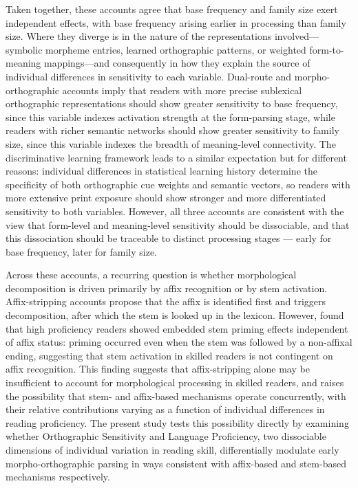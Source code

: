 Taken together, these accounts agree that base frequency and family size exert independent effects, with base frequency arising earlier in processing than family size. Where they diverge is in the nature of the representations involved---symbolic morpheme entries, learned orthographic patterns, or weighted form-to-meaning mappings---and consequently in how they explain the source of individual differences in sensitivity to each variable. Dual-route and morpho-orthographic accounts imply that readers with more precise sublexical orthographic representations should show greater sensitivity to base frequency, since this variable indexes activation strength at the form-parsing stage, while readers with richer semantic networks should show greater sensitivity to family size, since this variable indexes the breadth of meaning-level connectivity. The discriminative learning framework leads to a similar expectation but for different reasons: individual differences in statistical learning history determine the specificity of both orthographic cue weights and semantic vectors, so readers with more extensive print exposure should show stronger and more differentiated sensitivity to both variables. However, all three accounts are consistent with the view that form-level and meaning-level sensitivity should be dissociable, and that this dissociation should be traceable to distinct processing stages --- early for base frequency, later for family size.
	
	Across these accounts, a recurring question is whether morphological decomposition is driven primarily by affix recognition or by stem activation. Affix-stripping accounts \citep{taft_lexical_1975, rastleMorphologicalDecompositionBased2008} propose that the affix is identified first and triggers decomposition, after which the stem is looked up in the lexicon. However, \citet{beyersmannEmbeddedStemPriming2016} found that high proficiency readers showed embedded stem priming effects independent of affix status: priming occurred even when the stem was followed by a non-affixal ending, suggesting that stem activation in skilled readers is not contingent on affix recognition. This finding suggests that affix-stripping alone may be insufficient to account for morphological processing in skilled readers, and raises the possibility that stem- and affix-based mechanisms operate concurrently, with their relative contributions varying as a function of individual differences in reading proficiency. The present study tests this possibility directly by examining whether Orthographic Sensitivity and Language Proficiency, two dissociable dimensions of individual variation in reading skill, differentially modulate early morpho-orthographic parsing in ways consistent with affix-based and stem-based mechanisms respectively.
	
